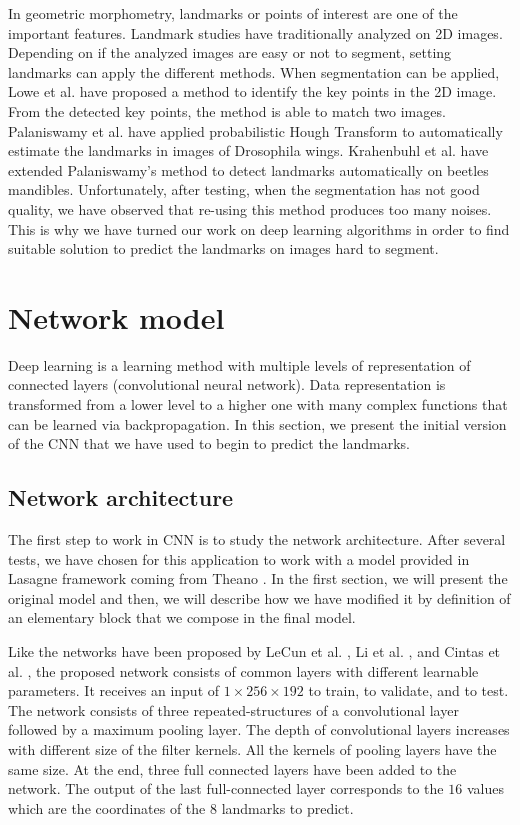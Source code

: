 \documentclass[10pt]{article}
\begin{document}
In geometric morphometry, landmarks or points of interest are one of
the important features. Landmark studies have traditionally
analyzed on 2D images. Depending on if the analyzed images are
easy or not to segment, setting landmarks can apply
the different methods. When segmentation can be applied, Lowe et
al. \cite{lowe2004distinctive} have proposed a method to identify the
key points in the 2D image. From the detected key points, the method
is able to match two images. Palaniswamy et
al. \cite{palaniswamy2010automatic} have applied probabilistic Hough
Transform to automatically estimate the landmarks in images of
Drosophila wings. Krahenbuhl et al. \cite{le2017maelab} have extended
Palaniswamy's method to detect landmarks automatically on beetles
mandibles. Unfortunately, after testing, when the segmentation has not good quality,
we have observed that re-using this method produces too many
noises. This is why we have turned our work on deep learning
algorithms in order to find suitable solution to predict the landmarks
on images hard to segment.


\section{Network model}
Deep learning is a learning method with multiple levels of
representation of connected layers (convolutional neural
network). Data representation is transformed from a lower level to a
higher one with many complex functions that can be learned via
backpropagation. In this section, we present the initial version of the CNN that we have used
to begin to predict the landmarks. 

\subsection{Network architecture}
\label{secmodel}
The first step to work in CNN is to study the network
architecture. After several tests, we have chosen for this application
to work with a model provided in Lasagne framework \cite{lasagne} coming from
Theano \cite{2016arXiv160502688short}. In the first section, we will present the original model
and then, we will describe how we have modified it by definition of an
elementary block that we compose in the final model.


Like the networks have been proposed by LeCun et al. \cite{lecun2010convolutional}, Li et al. \cite{li2015convolutional}, and Cintas et al. \cite{cintas2016automatic}, the proposed network consists of common layers
with different learnable parameters. It receives an input of $1 \times
256 \times 192$ to train, to validate, and to  test. The network
consists of three repeated-structures of a convolutional layer
followed by a maximum pooling layer. The depth of convolutional layers increases with different size of the filter kernels.
All the kernels of pooling layers have the same size. 
At the end, three full connected layers have been added to the
network. The output of the last full-connected
layer corresponds to the $16$ values which are the coordinates of the
$8$ landmarks to predict.
\end{document}
